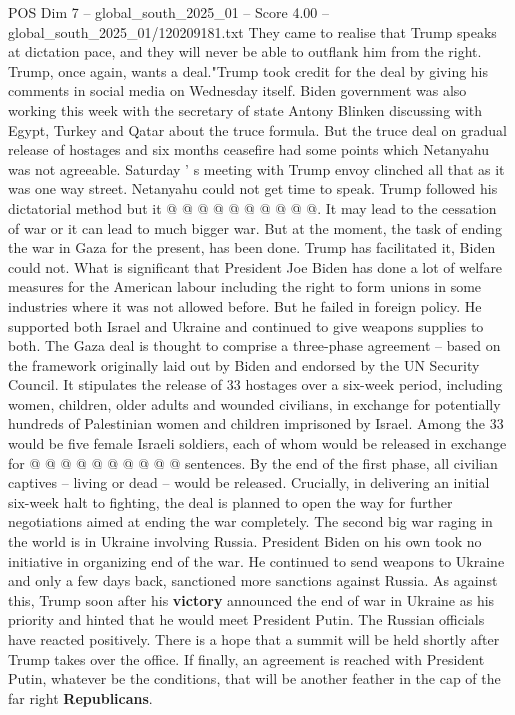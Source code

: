 \begin{textsample}{POS Dim 7 – global\_south\_2025\_01 – Score 4.00 – global\_south\_2025\_01/120209181.txt}
They came to realise that Trump speaks at dictation pace, and they will never be able to outflank him from the right.
Trump, once again, wants a deal."Trump took credit for the deal by giving his comments in social media on Wednesday itself.
Biden government was also working this week with the secretary of state Antony Blinken discussing with Egypt, Turkey and Qatar about the truce formula.
But the truce deal on gradual release of hostages and six months ceasefire had some points which Netanyahu was not agreeable.
Saturday ' s meeting with Trump envoy clinched all that as it was one way street.
Netanyahu could not get time to speak.
Trump followed his dictatorial method but it @ @ @ @ @ @ @ @ @ @.
It may lead to the cessation of war or it can lead to much bigger war.
But at the moment, the task of ending the war in Gaza for the present, has been done.
Trump has facilitated it, Biden could not.
What is significant that President Joe Biden has done a lot of welfare measures for the American labour including the right to form unions in some industries where it was not allowed before.
But he failed in foreign policy.
He supported both Israel and Ukraine and continued to give weapons supplies to both.
The Gaza deal is thought to comprise a three-phase agreement -- based on the framework originally laid out by Biden and endorsed by the UN Security Council.
It stipulates the release of 33 hostages over a six-week period, including women, children, older adults and wounded civilians, in exchange for potentially hundreds of Palestinian women and children imprisoned by Israel.
Among the 33 would be five female Israeli soldiers, each of whom would be released in exchange for @ @ @ @ @ @ @ @ @ @ sentences.
By the end of the first phase, all civilian captives -- living or dead -- would be released.
Crucially, in delivering an initial six-week halt to fighting, the deal is planned to open the way for further negotiations aimed at ending the war completely.
The second big war raging in the world is in Ukraine involving Russia.
President Biden on his own took no initiative in organizing end of the war.
He continued to send weapons to Ukraine and only a few days back, sanctioned more sanctions against Russia.
As against this, Trump soon after his \textbf{victory} announced the end of war in Ukraine as his priority and hinted that he would meet President Putin.
The Russian officials have reacted positively.
There is a hope that a summit will be held shortly after Trump takes over the office.
If finally, an agreement is reached with President Putin, whatever be the conditions, that will be another feather in the cap of the far right \textbf{Republicans}.

\end{textsample}
